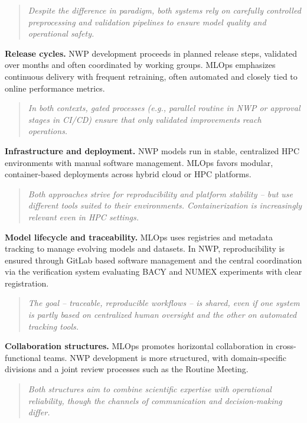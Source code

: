 \begin{quote}
	\emph{Despite the difference in paradigm, both systems rely on carefully controlled preprocessing and validation pipelines to ensure model quality and operational safety.}
\end{quote}

{\bf Release cycles.} NWP development proceeds in planned release steps, validated over months and often coordinated by working groups. MLOps emphasizes continuous delivery with frequent retraining, often automated and closely tied to online performance metrics.

\begin{quote}
	\emph{In both contexts, gated processes (e.g., parallel routine in NWP or approval stages in CI/CD) ensure that only validated improvements reach operations.}
\end{quote}

{\bf Infrastructure and deployment.} NWP models run in stable, centralized HPC environments with manual software management. MLOps favors modular, container-based deployments across hybrid cloud or HPC platforms.

\begin{quote}
	\emph{Both approaches strive for reproducibility and platform stability -- but use different tools suited to their environments. Containerization is increasingly relevant even in HPC settings.}
\end{quote}

{\bf Model lifecycle and traceability.} MLOps uses registries and metadata tracking to manage evolving models and datasets. In NWP, reproducibility is ensured through GitLab based software management and the central coordination via the verification system evaluating BACY and NUMEX experiments with clear registration.

\begin{quote}
	\emph{The goal -- traceable, reproducible workflows -- is shared, even if one system is partly based on centralized human oversight and the other on automated tracking tools.}
\end{quote}

{\bf Collaboration structures.} MLOps promotes horizontal collaboration in cross-functional teams. NWP development is more structured, with domain-specific divisions and a joint review processes such as the Routine Meeting. 

\begin{quote}
	\emph{Both structures aim to combine scientific expertise with operational reliability, though the channels of communication and decision-making differ.}
\end{quote}

